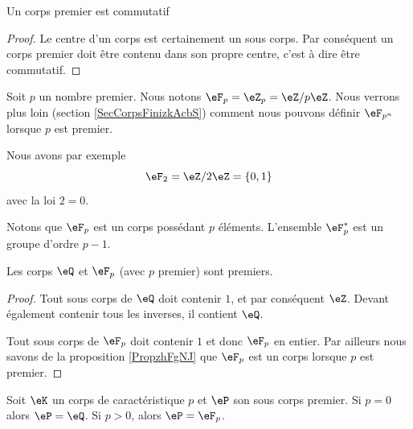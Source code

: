 \begin{lemma}
    Un corps premier est commutatif
\end{lemma}

\begin{proof}
    Le centre d'un corps est certainement un sous corps. Par conséquent un corps premier doit être contenu dans son propre centre, c'est à dire être commutatif.
\end{proof}

Soit \( p\) un nombre premier. Nous notons \( \eF_p=\eZ_p=\eZ/p\eZ\). Nous verrons plus loin (section \ref{SecCorpsFinizkAcbS}) comment nous pouvons définir \( \eF_{p^n}\) lorsque \( p\) est premier.

Nous avons par exemple 
\begin{equation}
    \eF_2=\eZ/2\eZ=\{ 0,1 \}
\end{equation}
avec la loi \( 2=0\).

Notons que \( \eF_p\) est un corps possédant \( p\) éléments. L'ensemble \( \eF_p^*\) est un groupe d'ordre \( p-1\).

\begin{lemma}
    Les corps \( \eQ\) et \( \eF_p\) (avec \( p\) premier) sont premiers.
\end{lemma}

\begin{proof}
    Tout sous corps de \( \eQ\) doit contenir \( 1\), et par conséquent \( \eZ\). Devant également contenir tous les inverses, il contient \( \eQ\).

    Tout sous corps de \(\eF_p \) doit contenir \( 1\) et donc \( \eF_p\) en entier. Par ailleurs nous savons de la proposition \ref{PropzhFgNJ} que \( \eF_p\) est un corps lorsque \( p\) est premier.
\end{proof}

\begin{proposition}
    Soit \( \eK\) un corps de caractéristique \( p\) et \( \eP\) son sous corps premier. Si \( p=0\) alors \( \eP=\eQ\). Si \( p>0\), alors \( \eP=\eF_p\).
\end{proposition}

